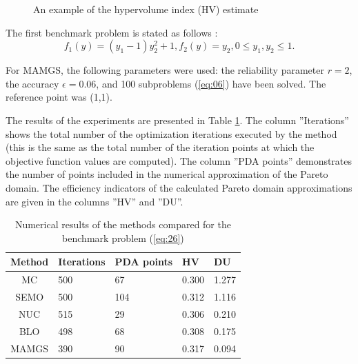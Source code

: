 \documentclass[smallcondensed]{svjour3}     %
\begin{document}
\begin{figure}
\caption{An example of the hypervolume index (HV) estimate}
\label{fig:01}
\end{figure}

The first benchmark problem is stated as follows \cite{c10}:
\begin{equation}\label{eq:26}
f_1 (y)=(y_1-1) y_2^2+1, f_2 (y)=y_2, 0 \leq y_1,y_2 \leq 1.
\end{equation}

For MAMGS, the following parameters were used: the reliability parameter $r=2$, the accuracy $\epsilon = 0.06$, and 100 subproblems (\ref{eq:06}) have been solved. The reference point was (1,1).\par

The results of the experiments are presented in Table \ref{tab:01}. The column ''Iterations'' shows the total number of the optimization iterations executed by the method (this is the same as the total number of the iteration points at which the objective function values are computed). The column ''PDA points'' demonstrates the number of points included in the numerical approximation of the Pareto domain. The efficiency indicators of the calculated Pareto domain approximations are given in the columns ''HV'' and ''DU''.

\begin{table}[t]
\centering
\caption{Numerical results of the methods compared for the benchmark problem  (\ref{eq:26})}
\label{tab:01}
\begin{tabular}{cllll}
\hline
\textbf{Method} & \textbf{Iterations} & \textbf{PDA points} & \textbf{HV} & \textbf{DU} \\ \hline
MC              & 500                 & 67                  & 0.300       & 1.277       \\
SEMO            & 500                 & 104                 & 0.312       & 1.116       \\
NUC             & 515                 & 29                  & 0.306       & 0.210       \\
BLO             & 498                 & 68                  & 0.308       & 0.175       \\
MAMGS           & 390                 & 90                  & 0.317       & 0.094       \\ \hline
\end{tabular}
\end{table}
\end{document}
